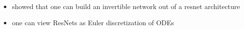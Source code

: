 \begin{frame}[t]
\begin{itemize}
\item \cite{behrmann2019invertible} showed that one can build an invertible network out of a resnet architecture \parencite{He:2015wrn} 
\item one can view ResNets as Euler discretization of ODEs 
\end{itemize}
\end{frame}

